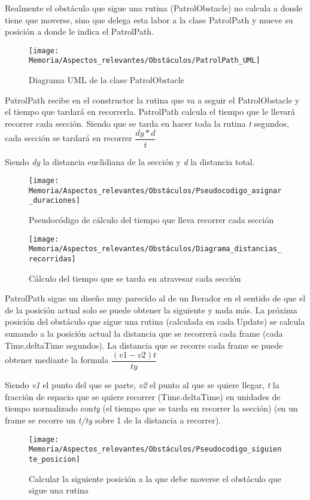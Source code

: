 Realmente el obstáculo que sigue una rutina (PatrolObstacle) no calcula a donde tiene que moverse, sino que delega esta labor a la clase PatrolPath y mueve su posición a donde le indica el PatrolPath.

\begin{figure}[h]
\centering
\texttt{[image: Memoria/Aspectos\_relevantes/Obstáculos/PatrolPath\_UML]}
\caption{Diagrama UML de la clase PatrolObstacle}
\end{figure}

PatrolPath recibe en el constructor la rutina que va a seguir el PatrolObstacle y el tiempo que tardará en recorrerla. PatrolPath calcula el tiempo que le llevará recorrer cada sección. Siendo que se tarda en hacer toda la rutina \textit{t} segundos, cada sección se tardará en recorrer $\dfrac{dy*d}{t}$

Siendo \textit{dy} la distancia euclidiana de la sección y \textit{d} la distancia total.

\begin{figure}[h]
\centering
\texttt{[image: Memoria/Aspectos\_relevantes/Obstáculos/Pseudocodigo\_asignar\_duraciones]}
\caption{Pseudocódigo de cálculo del tiempo que lleva recorrer cada sección}
\end{figure}

\clearpage
\begin{figure}[h]
\centering
\texttt{[image: Memoria/Aspectos\_relevantes/Obstáculos/Diagrama\_distancias\_recorridas]}
\caption{Cálculo del tiempo que se tarda en atravesar cada sección}
\end{figure}

PatrolPath sigue un diseño muy parecido al de un Iterador en el sentido de que el de la posición actual solo se puede obtener la siguiente y nada más.
La próxima posición del obstáculo que sigue una rutina (calculada en cada Update) se calcula sumando a la posición actual la distancia que se recorrerá cada frame (cada Time.deltaTime segundos).
La distancia que se recorre cada frame se puede obtener mediante la formula $\dfrac{(v1-v2)t}{ty}$

Siendo \textit{v1} el punto del que se parte, \textit{v2} el punto al que se quiere llegar, \textit{t} la fracción de espacio que se quiere recorrer (Time.deltaTime) en unidades de tiempo normalizado con\textit{ty} (el tiempo que se tarda en recorrer la sección) (en un frame se recorre un \textit{t/ty} sobre 1 de la distancia a recorrer).

\clearpage
\begin{figure}[h]
\centering
\texttt{[image: Memoria/Aspectos\_relevantes/Obstáculos/Pseudocodigo\_siguiente\_posicion]}
\caption{Calcular la siguiente posición a la que debe moverse el obstáculo que sigue una rutina}
\end{figure}